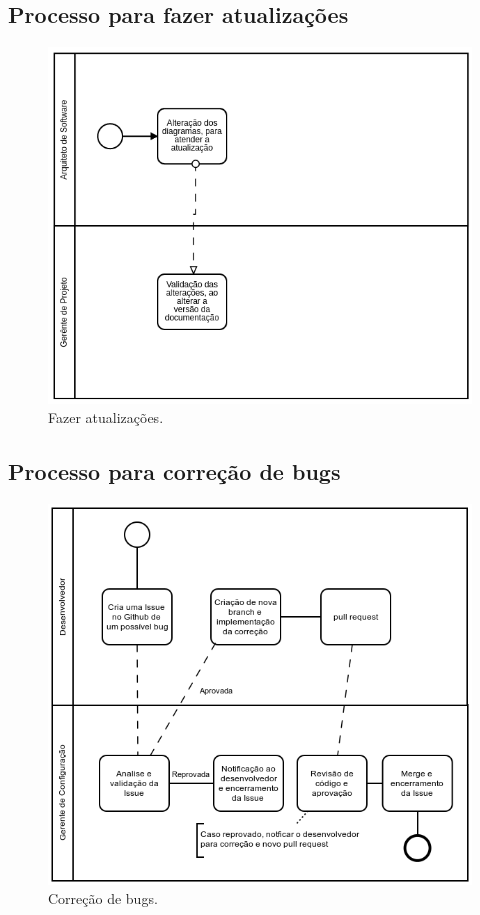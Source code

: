 \documentclass{article}
\begin{document}
        \subsection{Processo para fazer atualizações}
			\begin{figure}[H]
				\includegraphics[width=\linewidth]{processo_para_atualizacao}
				\caption{Fazer atualizações.}
				\label{fig:processoatualizacoes}
			\end{figure}
        \subsection{Processo para correção de bugs}
	        \begin{figure}[H]
	        	\includegraphics[width=\linewidth]{bug.png}
	        	\caption{Correção de bugs.}
	        \end{figure}
\end{document}
